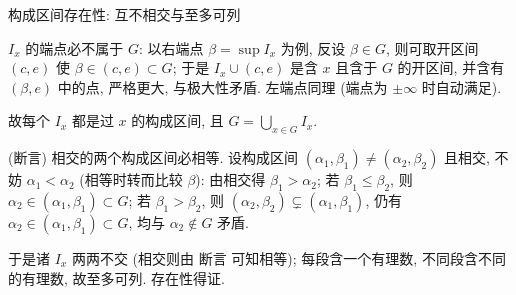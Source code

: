 \begin{frame}{构成区间存在性: 互不相交与至多可列}

$I_x$ 的端点必不属于 $G$: 以右端点 $\beta = \sup I_x$ 为例, 反设 $\beta \in G$, 则可取开区间 $(c, e)$ 使 $\beta \in (c, e) \subset G$; 于是 $I_x \cup (c, e)$ 是含 $x$ 且含于 $G$ 的开区间, 并含有 $(\beta, e)$ 中的点, 严格更大, 与极大性矛盾. 左端点同理 (端点为 $\pm\infty$ 时自动满足).

\pause

故每个 $I_x$ 都是过 $x$ 的构成区间, 且 $G = \bigcup_{x \in G} I_x$.

\pause
\vspace{1em}

\startproof[bg=yellow, fg=red](断言)
相交的两个构成区间必相等. 设构成区间 $(\alpha_1, \beta_1) \neq (\alpha_2, \beta_2)$ 且相交, 不妨 $\alpha_1 < \alpha_2$ (相等时转而比较 $\beta$): 由相交得 $\beta_1 > \alpha_2$; 若 $\beta_1 \leqslant \beta_2$, 则 $\alpha_2 \in (\alpha_1, \beta_1) \subset G$; 若 $\beta_1 > \beta_2$, 则 $(\alpha_2, \beta_2) \subsetneq (\alpha_1, \beta_1)$, 仍有 $\alpha_2 \in (\alpha_1, \beta_1) \subset G$, 均与 $\alpha_2 \notin G$ 矛盾.

\pause
\vspace{1em}

于是诸 $I_x$ \alert{两两不交} (相交则由 \alert{断言} 可知相等); 每段含一个有理数, 不同段含不同的有理数, 故\alert{至多可列}. 存在性得证.

\end{frame}


